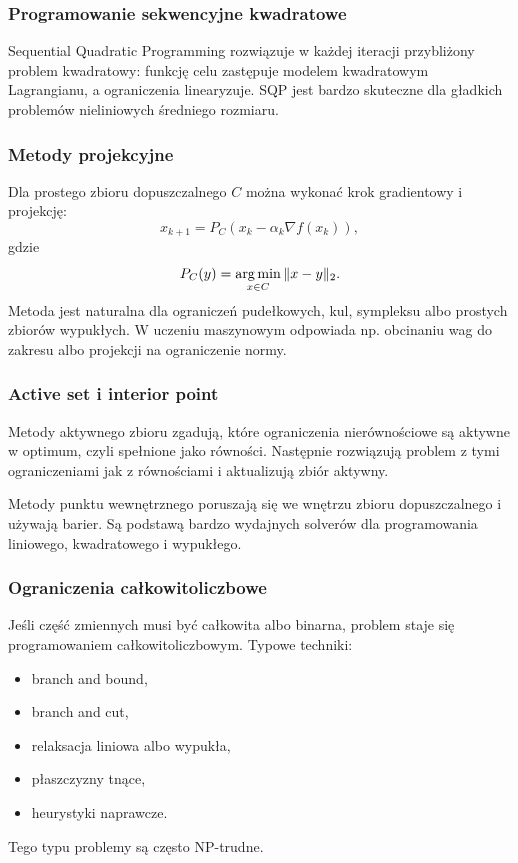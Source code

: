 \subsubsection{Programowanie sekwencyjne kwadratowe}

Sequential Quadratic Programming rozwiązuje w każdej iteracji przybliżony problem kwadratowy: funkcję celu zastępuje modelem kwadratowym Lagrangianu, a ograniczenia linearyzuje. SQP jest bardzo skuteczne dla gładkich problemów nieliniowych średniego rozmiaru.

\subsubsection{Metody projekcyjne}

Dla prostego zbioru dopuszczalnego $C$ można wykonać krok gradientowy i projekcję:
\[
x_{k+1}=P_C(x_k-\alpha_k\nabla f(x_k)),
\]
gdzie
\[
P_C(y)=\operatorname*{arg\,min}_{x\in C}\|x-y\|_2.
\]
Metoda jest naturalna dla ograniczeń pudełkowych, kul, sympleksu albo prostych zbiorów wypukłych. W uczeniu maszynowym odpowiada np. obcinaniu wag do zakresu albo projekcji na ograniczenie normy.

\subsubsection{Active set i interior point}

Metody aktywnego zbioru zgadują, które ograniczenia nierównościowe są aktywne w optimum, czyli spełnione jako równości. Następnie rozwiązują problem z tymi ograniczeniami jak z równościami i aktualizują zbiór aktywny.

Metody punktu wewnętrznego poruszają się we wnętrzu zbioru dopuszczalnego i używają barier. Są podstawą bardzo wydajnych solverów dla programowania liniowego, kwadratowego i wypukłego.

\subsubsection{Ograniczenia całkowitoliczbowe}

Jeśli część zmiennych musi być całkowita albo binarna, problem staje się programowaniem całkowitoliczbowym. Typowe techniki:
\begin{itemize}
  \item branch and bound,
  \item branch and cut,
  \item relaksacja liniowa albo wypukła,
  \item płaszczyzny tnące,
  \item heurystyki naprawcze.
\end{itemize}
Tego typu problemy są często NP-trudne.

